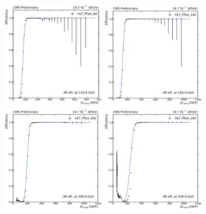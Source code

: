 \begin{figure}[htbp]
    \centering
    \includegraphics[width=0.45\textwidth]{figures/measurement/trigger_eff_hltpfjet80.pdf}\hfill
    \includegraphics[width=0.45\textwidth]{figures/measurement/trigger_eff_hltpfjet140.pdf}
    \includegraphics[width=0.45\textwidth]{figures/measurement/trigger_eff_hltpfjet200.pdf}\hfill
    \includegraphics[width=0.45\textwidth]{figures/measurement/trigger_eff_hltpfjet260.pdf}

\end{figure}
